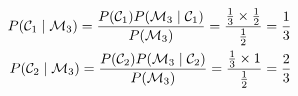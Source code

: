 \begin{align}
    P( \mathcal{C}_1 \mid \mathcal{M}_3 ) = \frac{P( \mathcal{C}_1 ) P( \mathcal{M}_3 \mid \mathcal{C}_1 )}{P( \mathcal{M}_3 )} = \frac{\frac{1}{3} \times \frac{1}{2}}{\frac{1}{2}} = \frac{1}{3} \\
    P( \mathcal{C}_2 \mid \mathcal{M}_3 ) = \frac{P( \mathcal{C}_2 ) P( \mathcal{M}_3 \mid \mathcal{C}_2 )}{P( \mathcal{M}_3 )} = \frac{\frac{1}{3} \times 1}{\frac{1}{2}} = \frac{2}{3}
\end{align}


